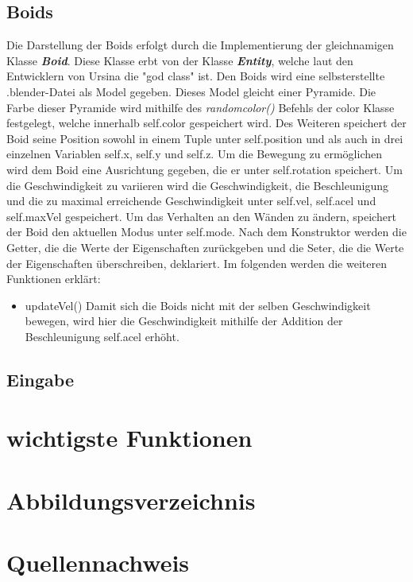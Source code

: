 \documentclass[a4paper, 12pt]{article}
\begin{document}
	\subsection{Boids}
	Die Darstellung der Boids erfolgt durch die Implementierung der gleichnamigen Klasse \textbf{\emph{Boid}}. Diese Klasse erbt von der Klasse \textbf{\emph{Entity}}, welche laut den Entwicklern von Ursina die "god class" ist. 
	Den Boids wird eine selbsterstellte .blender-Datei als Model gegeben. Dieses Model gleicht einer Pyramide. Die Farbe dieser Pyramide wird mithilfe des \emph{random\textunderscore color()} Befehls der color Klasse festgelegt, welche innerhalb self.color gespeichert wird. Des Weiteren speichert der Boid seine Position sowohl in einem Tuple unter self.position und als auch in drei einzelnen Variablen self.x, self.y und self.z. Um die Bewegung zu ermöglichen wird dem Boid eine Ausrichtung gegeben, die er unter self.rotation speichert. Um die Geschwindigkeit zu variieren wird die Geschwindigkeit, die Beschleunigung und die zu maximal erreichende Geschwindigkeit unter self.vel, self.acel und self.maxVel gespeichert. Um das Verhalten an den Wänden zu ändern, speichert der Boid den aktuellen Modus unter self.mode. 
	Nach dem Konstruktor werden die Getter, die die Werte der Eigenschaften zurückgeben und die Seter, die die Werte der Eigenschaften überschreiben, deklariert.
	Im folgenden werden die weiteren Funktionen erklärt:
	\begin{itemize}
		\item updateVel()
		Damit sich die Boids nicht mit der selben Geschwindigkeit bewegen, wird hier die Geschwindigkeit mithilfe der Addition der Beschleunigung self.acel erhöht.
	\end{itemize}
	\subsection{Eingabe}
	\newpage
	\section{wichtigste Funktionen}
	\newpage
	\section{Abbildungsverzeichnis}
	\newpage
	\section{Quellennachweis}
	\newpage
\end{document}
